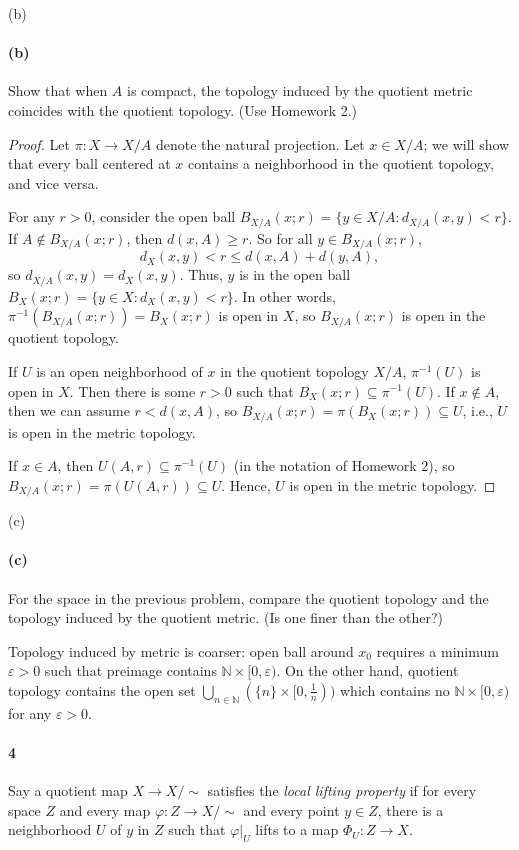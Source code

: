 \documentclass[12pt]{article}
\newlength{\myparskip}
\newenvironment{fullbox}{\begin{lrbox}{\savefullbox}\begin{minipage}{\dimexpr\textwidth-2\fboxsep\relax}\setlength{\parskip}{\myparskip}}{\end{minipage}\end{lrbox}\framebox[\textwidth]{\usebox{\savefullbox}}}
\newenvironment{pbox}[1][]{\begin{fullbox}\ifx#1\empty\else\paragraph{#1}\fi}{\end{fullbox}}
\newcommand{\N}{\mathbb{N}}
\newcommand{\eps}{\varepsilon}
\renewcommand{\phi}{\varphi}
\newcommand{\<}{\langle}
\renewcommand{\>}{\rangle}
\theoremstyle{definition}
\begin{document}
\begin{pbox}[(b)]
    Show that when $A$ is compact, the topology induced by the quotient metric coincides with the quotient topology.  (Use Homework 2.)
\end{pbox}

\begin{proof}
    Let $\pi : X \to X/A$ denote the natural projection. Let $x \in X/A$; we will show that every ball centered at $x$ contains a neighborhood in the quotient topology, and vice versa.

    For any $r > 0$, consider the open ball $B_{X/A}(x; r) = \{y \in X/A : d_{X/A}(x, y) < r\}$. If $A \notin B_{X/A}(x; r)$, then $d(x, A) \geq r$. So for all $y \in B_{X/A}(x; r)$,
    \[
        d_X(x, y) < r \leq d(x, A) + d(y, A),
    \]
    so $d_{X/A}(x, y) = d_X(x, y)$. Thus, $y$ is in the open ball $B_X(x; r) = \{y \in X : d_X(x, y) < r\}$. In other words, $\pi^{-1}(B_{X/A}(x; r)) = B_X(x; r)$ is open in $X$, so $B_{X/A}(x; r)$ is open in the quotient topology.

    If $U$ is an open neighborhood of $x$ in the quotient topology $X/A$, $\pi^{-1}(U)$ is open in $X$. Then there is some $r > 0$ such that $B_X(x; r) \subseteq \pi^{-1}(U)$. If $x \notin A$, then we can assume $r < d(x, A)$, so $B_{X/A}(x; r) = \pi(B_X(x; r)) \subseteq U$, i.e., $U$ is open in the metric topology.
    
    If $x \in A$, then $U(A, r) \subseteq \pi^{-1}(U)$ (in the notation of Homework 2), so $B_{X/A}(x; r) = \pi(U(A, r)) \subseteq U$. Hence, $U$ is open in the metric topology. 


\end{proof}

\begin{pbox}[(c)]
    For the space in the previous problem, compare the quotient topology and the topology induced by the quotient metric.  (Is one finer than the other?)
\end{pbox}

Topology induced by metric is coarser: open ball around $x_0$ requires a minimum $\eps > 0$ such that preimage contains $\N \times [0, \eps)$. On the other hand, quotient topology contains the open set $\bigcup_{n \in \N} (\{n\} \times [0, \frac{1}{n}))$ which contains no $\N \times [0, \eps)$ for any $\eps > 0$.



\newpage
\begin{pbox}[4]
    Say a quotient map $X \to X/{\sim}$ satisfies the \emph{local lifting property} if for every space $Z$ and every map $\phi:Z \to X/{\sim}$ and every point $y \in Z$, there is a neighborhood $U$ of $y$ in $Z$ such that $\phi|_U$ lifts to a map $\Phi_U:Z \to X$.
\end{pbox}
\end{document}
